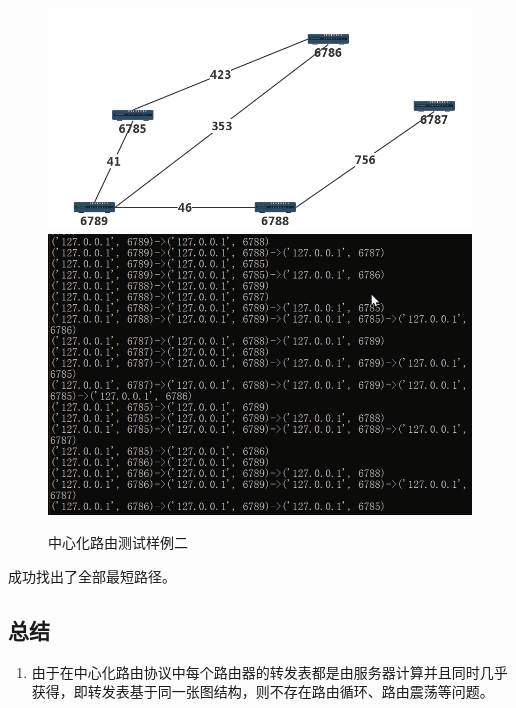		\begin{figure}[H]
			\centering
			\includegraphics[scale=0.4]{imgs/topo3/topo2.png}
			\includegraphics[scale=1]{imgs/cenTest2.PNG}
			\caption{中心化路由测试样例二}
			\label{fig:CentralizedTest2}
		\end{figure}
		成功找出了全部最短路径。
	\subsection{总结} %
	\label{sub:总结}
		\begin{enumerate}
			\item 由于在中心化路由协议中每个路由器的转发表都是由服务器计算并且同时几乎获得，即转发表基于同一张图结构，则不存在路由循环、路由震荡等问题。
		\end{enumerate}

